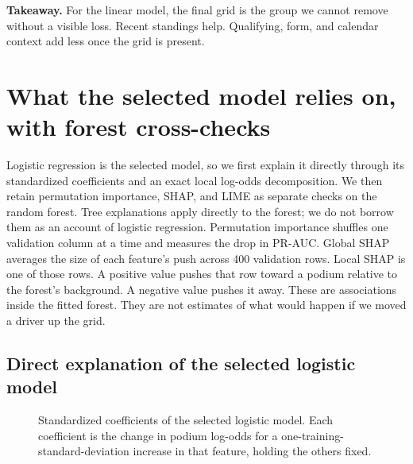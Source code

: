 \documentclass[10pt,a4paper]{article}
\begin{document}
\begin{takeaway}
\textbf{Takeaway.} For the linear model, the final grid is the group we cannot remove without a visible loss. Recent standings help. Qualifying, form, and calendar context add less once the grid is present.
\end{takeaway}



\section{What the selected model relies on, with forest cross-checks}


Logistic regression is the selected model, so we first explain it directly through its standardized coefficients and an exact local log-odds decomposition. We then retain permutation importance, SHAP, and LIME as separate checks on the random forest. Tree explanations apply directly to the forest; we do not borrow them as an account of logistic regression. Permutation importance shuffles one validation column at a time and measures the drop in PR-AUC. Global SHAP averages the size of each feature's push across 400 validation rows. Local SHAP is one of those rows. A positive value pushes that row toward a podium relative to the forest's background. A negative value pushes it away. These are associations inside the fitted forest. They are not estimates of what would happen if we moved a driver up the grid.



\subsection{Direct explanation of the selected logistic model}


\begin{figure}[H]
\centering
{}
\caption{Standardized coefficients of the selected logistic model. Each coefficient is the change in podium log-odds for a one-training-standard-deviation increase in that feature, holding the others fixed.}
\end{figure}
\end{document}
